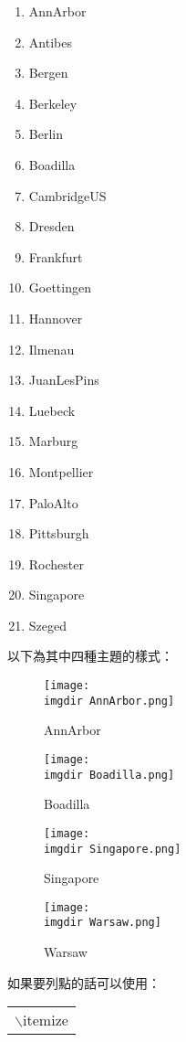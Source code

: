 \begin{enumerate}
\item AnnArbor
\item Antibes
\item Bergen
\item Berkeley
\item Berlin
\item Boadilla
\item CambridgeUS
\item Dresden
\item Frankfurt
\item Goettingen
\item Hannover
\item Ilmenau
\item JuanLesPins
\item Luebeck
\item Marburg
\item Montpellier
\item PaloAlto
\item Pittsburgh
\item Rochester
\item Singapore
\item Szeged
\end{enumerate}
以下為其中四種主題的樣式：
\begin{figure}[htbp]
\centering
\begin{minipage}{0.49\linewidth}
\centering
\texttt{[image: \\imgdir AnnArbor.png]}
\caption{AnnArbor}
\label{AnnArbor}
\end{minipage}
\begin{minipage}{0.49\linewidth}
\centering
\texttt{[image: \\imgdir Boadilla.png]}
\caption{Boadilla}
\label{Boadilla}
\end{minipage}
\qquad
\begin{minipage}{0.49\linewidth}
\centering
\texttt{[image: \\imgdir Singapore.png]}
\caption{Singapore}
\label{Singapore}
\end{minipage}
\begin{minipage}{0.49\linewidth}
\centering
\texttt{[image: \\imgdir Warsaw.png]}
\caption{Warsaw}
\label{Warsaw}
\end{minipage}
\end{figure}
如果要列點的話可以使用：
\begin{center}\colorbox{slight}{\begin{tabular}{p{}}
	{$\backslash$itemize}
\end{tabular}}
\end{center}
